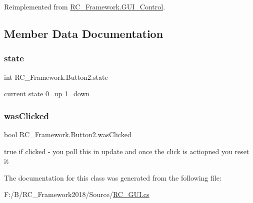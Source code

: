 Reimplemented from \mbox{\hyperlink{class_r_c___framework_1_1_g_u_i___control_a005e7f109afd21abd6576fdf70212af5}{R\+C\+\_\+\+Framework.\+G\+U\+I\+\_\+\+Control}}.



\subsection{Member Data Documentation}
\mbox{\label{class_r_c___framework_1_1_button2_a7b34b30866f790b3f0c5427bbeec5c91}} 
\subsubsection{\texorpdfstring{state}{state}}
{\footnotesize\ttfamily int R\+C\+\_\+\+Framework.\+Button2.\+state}



current state 0=up 1=down 

\mbox{\label{class_r_c___framework_1_1_button2_abb085079359e47904684e34467809f00}} 
\subsubsection{\texorpdfstring{was\+Clicked}{wasClicked}}
{\footnotesize\ttfamily bool R\+C\+\_\+\+Framework.\+Button2.\+was\+Clicked}



true if clicked -\/ you poll this in update and once the click is actiopned you reset it 



The documentation for this class was generated from the following file\+:\begin{DoxyCompactItemize}
\item 
F\+:/\+B/\+R\+C\+\_\+\+Framework2018/\+Source/\mbox{\hyperlink{_r_c___g_u_i_8cs}{R\+C\+\_\+\+G\+U\+I.\+cs}}\end{DoxyCompactItemize}
